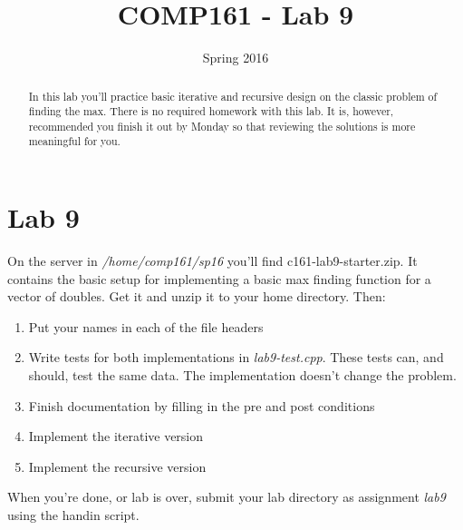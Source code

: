 \documentclass[]{tufte-handout}
\title{COMP161 - Lab 9}
\author{}
\date{Spring 2016}
\begin{document}
\maketitle

\begin{abstract}
In this lab you'll practice basic iterative and recursive design on the classic problem of finding the max. There is no required homework with this lab. It is, however, recommended you finish it out by Monday so that reviewing the solutions is more meaningful for you.
\end{abstract}

\section{Lab 9}

On the server in \textit{/home/comp161/sp16} you'll find c161-lab9-starter.zip. It contains the basic setup for implementing a basic max finding function for a vector of doubles. Get it and unzip it to your home directory. Then:
\begin{enumerate}
\item Put your names in each of the file headers
\item Write tests for both implementations in \textit{lab9-test.cpp}.  These tests can, and should, test the same data. The implementation doesn't change the problem.
\item Finish documentation by filling in the pre and post conditions
\item Implement the iterative version
\item Implement the recursive version
\end{enumerate}

When you're done, or lab is over, submit your lab directory as assignment \textit{lab9} using the handin script. 
\end{document}
